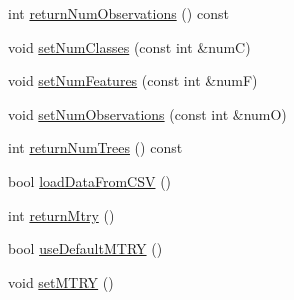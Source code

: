 \begin{DoxyCompactItemize}
\item 
int \hyperlink{classfp_1_1fpInfo_a8e340d343bc946ffd6be09a001e3e5dd}{return\+Num\+Observations} () const
\item 
void \hyperlink{classfp_1_1fpInfo_a577f80c50c60a7e48bb6ca444843cdba}{set\+Num\+Classes} (const int \&numC)
\item 
void \hyperlink{classfp_1_1fpInfo_ab8b97144a2a9ebd565d81de4b63f490c}{set\+Num\+Features} (const int \&numF)
\item 
void \hyperlink{classfp_1_1fpInfo_a97b1a91a4b64e8de811adae7313f73af}{set\+Num\+Observations} (const int \&numO)
\item 
int \hyperlink{classfp_1_1fpInfo_a7711d632e8718a60070594e9c731599a}{return\+Num\+Trees} () const
\item 
bool \hyperlink{classfp_1_1fpInfo_a2a6ac3cfea5db5842baa1789468492ad}{load\+Data\+From\+C\+SV} ()
\item 
int \hyperlink{classfp_1_1fpInfo_a058477c4f05818c220efa469b7b630bb}{return\+Mtry} ()
\item 
bool \hyperlink{classfp_1_1fpInfo_a0a00d3d54cef667000249202a2d768bf}{use\+Default\+M\+T\+RY} ()
\item 
void \hyperlink{classfp_1_1fpInfo_a6b2a54fb9b3672e7b1bab3474a0ca33f}{set\+M\+T\+RY} ()
\end{DoxyCompactItemize}

